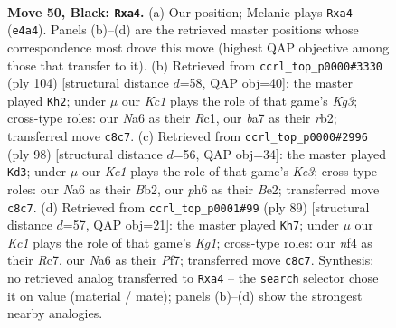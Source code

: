 \documentclass[11pt]{article}
\begin{document}
\clearpage

\begin{figure}[p]\centering
\begin{subfigure}{0.46\textwidth}\centering
\resizebox{\linewidth}{!}{%
\newchessgame
\chessboard[
  setfen={1rkb4/Bp5p/n5pP/p4p2/P3rN2/3R2P1/7K/6R1 b - - 8 50},
  showmover=false,
  pgfstyle=straightmove, color=movearrow, markmove={e4-a4}
]}
\caption{}
\end{subfigure}\hfill
\begin{subfigure}{0.46\textwidth}\centering
\resizebox{\linewidth}{!}{%
\newchessgame
\chessboard[
  setfen={5k2/5p2/6pp/2rbP3/3R1P2/2p1P1KP/1rB3P1/2R5 w - - 40 53},
  showmover=false,
  pgfstyle=straightmove, color=movearrow, markmove={g3-h2}
]}
\caption{}
\end{subfigure}
\\[4pt]
\begin{subfigure}{0.46\textwidth}\centering
\resizebox{\linewidth}{!}{%
\newchessgame
\chessboard[
  setfen={3rk3/1p3pp1/pPn5/P1Rb4/3P4/4K1P1/1B2B3/8 w - - 19 50},
  showmover=false,
  pgfstyle=straightmove, color=movearrow, markmove={e3-d3}
]}
\caption{}
\end{subfigure}\hfill
\begin{subfigure}{0.46\textwidth}\centering
\resizebox{\linewidth}{!}{%
\newchessgame
\chessboard[
  setfen={6k1/2r2pp1/1NPRr2p/pp6/2p5/6PP/5PK1/3R4 b - - 1 45},
  showmover=false,
  pgfstyle=straightmove, color=movearrow, markmove={g8-h7}
]}
\caption{}
\end{subfigure}
\caption{\textbf{Move 50, Black: \texttt{Rxa4}.} (a) Our position; Melanie plays \texttt{Rxa4} (\texttt{e4a4}). Panels (b)--(d) are the retrieved master positions whose correspondence most drove this move (highest QAP objective among those that transfer to it). (b) Retrieved from \texttt{ccrl\_top\_p0000\#3330} (ply 104) [structural distance $d$=58, QAP obj=40]: the master played \texttt{Kh2}; under $\mu$ our \emph{Kc1} plays the role of that game's \emph{Kg3}; cross-type roles: our \emph{N}a6 as their \emph{R}c1, our \emph{b}a7 as their \emph{r}b2; transferred move \texttt{c8c7}. (c) Retrieved from \texttt{ccrl\_top\_p0000\#2996} (ply 98) [structural distance $d$=56, QAP obj=34]: the master played \texttt{Kd3}; under $\mu$ our \emph{Kc1} plays the role of that game's \emph{Ke3}; cross-type roles: our \emph{N}a6 as their \emph{B}b2, our \emph{p}h6 as their \emph{B}e2; transferred move \texttt{c8c7}. (d) Retrieved from \texttt{ccrl\_top\_p0001\#99} (ply 89) [structural distance $d$=57, QAP obj=21]: the master played \texttt{Kh7}; under $\mu$ our \emph{Kc1} plays the role of that game's \emph{Kg1}; cross-type roles: our \emph{n}f4 as their \emph{R}c7, our \emph{N}a6 as their \emph{P}f7; transferred move \texttt{c8c7}. Synthesis: no retrieved analog transferred to \texttt{Rxa4} -- the \texttt{search} selector chose it on value (material / mate); panels (b)--(d) show the strongest nearby analogies.}
\label{fig:thought-m99}
\end{figure}
\end{document}
